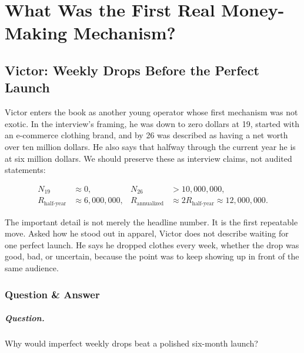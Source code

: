 \documentclass[11pt,oneside]{book}
\begin{document}

\chapter{What Was the First Real Money-Making Mechanism?}

\section{Victor: Weekly Drops Before the Perfect Launch}

Victor enters the book as another young operator whose first mechanism was not exotic. In the interview's framing, he was down to zero dollars at 19, started with an e-commerce clothing brand, and by 26 was described as having a net worth over ten million dollars. He also says that halfway through the current year he is at six million dollars. We should preserve these as interview claims, not audited statements:

\begin{align}
N_{19} &\approx 0, &
N_{26} &> 10{,}000{,}000,\\
R_{\text{half-year}} &\approx 6{,}000{,}000, &
R_{\text{annualized}} &\approx 2R_{\text{half-year}}
                     \approx 12{,}000{,}000.
\end{align}

The important detail is not merely the headline number. It is the first repeatable move. Asked how he stood out in apparel, Victor does not describe waiting for one perfect launch. He says he dropped clothes every week, whether the drop was good, bad, or uncertain, because the point was to keep showing up in front of the same audience.

\subsection{Question \& Answer}

\paragraph{Question.}
Why would imperfect weekly drops beat a polished six-month launch?
\end{document}
